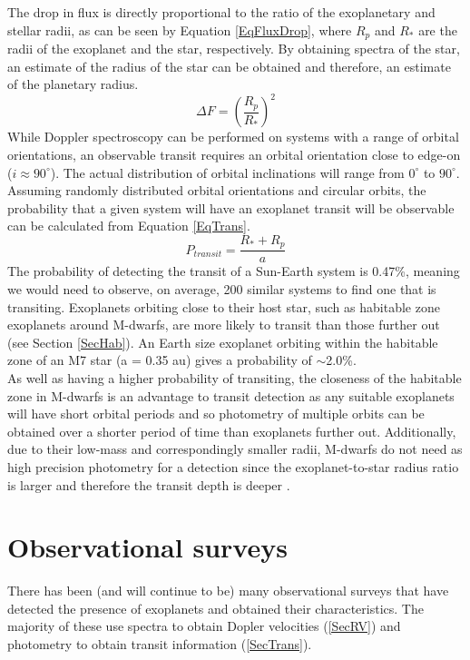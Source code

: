 The drop in flux is directly proportional to the ratio of the exoplanetary and stellar radii, as can be seen by Equation \ref{EqFluxDrop}, where $R_p$ and $R_\ast$ are the radii of the exoplanet and the star, respectively. By obtaining spectra of the star, an estimate of the radius of the star can be obtained and therefore, an estimate of the planetary radius.\\
\begin{equation}
\Delta F = \left(\frac{R_p}{R_\ast}\right)^2
\label{EqFluxDrop}
\end{equation}
While Doppler spectroscopy can be performed on systems with a range of orbital orientations, an observable transit requires an orbital orientation close to edge-on ($i \approx 90^\circ$). The actual distribution of orbital inclinations will range from $0^\circ$ to $90^\circ$. Assuming randomly distributed orbital orientations and circular orbits, the probability that a given system will have an exoplanet transit will be observable can be calculated from Equation \ref{EqTrans}.
\begin{equation}
P_{transit} = \frac{R_\ast + R_p}{a}
\label{EqTrans}
\end{equation}
The probability of detecting the transit of a Sun-Earth system is 0.47\%, meaning we would need to observe, on average, 200 similar systems to find one that is transiting. Exoplanets orbiting close to their host star, such as habitable zone exoplanets around M-dwarfs, are more likely to transit than those further out (see Section \ref{SecHab}). An Earth size exoplanet orbiting within the habitable zone of an M7 star (a = 0.35 au) gives a probability of $\sim$2.0\%.\\

As well as having a higher probability of transiting, the closeness of the habitable zone in M-dwarfs is an advantage to transit detection as any suitable exoplanets will have short orbital periods and so photometry of multiple orbits can be obtained over a shorter period of time than exoplanets further out. Additionally, due to their low-mass and correspondingly smaller radii, M-dwarfs do not need as high precision photometry for a detection since the exoplanet-to-star radius ratio is larger and therefore the transit depth is deeper \citep{2011Lepine}.
\section{Observational surveys}
There has been (and will continue to be) many observational surveys that have detected the presence of exoplanets and obtained their characteristics. The majority of these use spectra to obtain Dopler velocities (\ref{SecRV}) and photometry to obtain transit information (\ref{SecTrans}).
